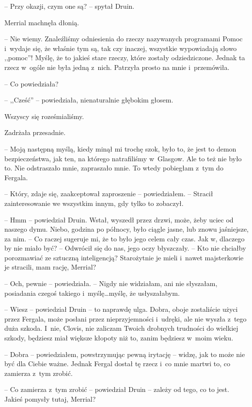 \documentclass[oneside,polish,11pt,sfheadings]{mwbk}
\begin{document}
-- Przy okazji, czym one są? -- spytał Druin.

Merrial machnęła dłonią. 

-- Nie wiemy. Znaleźliśmy odniesienia do rzeczy
nazywanych programami Pomoc i~wydaje się, że właśnie tym są, tak czy
inaczej, wszystkie wypowiadają słowo ,,pomoc''! Myślę, że to jakieś
stare rzeczy, które zostały odziedziczone. Jednak ta rzecz w~ogóle nie
była jedną z~nich. Patrzyła prosto na mnie i~przemówiła.

-- Co powiedziała?

-- ,,Cześć'' -- powiedziała, nienaturalnie głębokim głosem.

Wszyscy się roześmialiśmy.

Zadrżała przesadnie. 

-- Moją następną myślą, kiedy minął mi trochę szok,
było to, że jest to demon bezpieczeństwa, jak ten, na którego
natrafiliśmy w~Glasgow. Ale to też nie było to. Nie odstraszało mnie,
zapraszało mnie. To wtedy pobiegłam z~tym do Fergala.

-- Który, zdaje się, zaakceptował zaproszenie -- powiedziałem. -- Stracił
zainteresowanie we wszystkim innym, gdy tylko to zobaczył.

-- Hmm -- powiedział Druin. Wstał, wyszedł przez drzwi, może, żeby uciec
od naszego dymu. Niebo, godzina po północy, było ciągle jasne, lub znowu
jaśniejsze, za nim. -- Co raczej sugeruje mi, że to było jego celem cały
czas. Jak w, dlaczego by nie miało być? -- Odwrócił się do nas, jego oczy
błyszczały. -- Kto nie chciałby porozmawiać ze sztuczną inteligencją?
Starożytnie je mieli i~nawet majsterkowie je stracili, mam rację,
Merrial?

-- Och, pewnie -- powiedziała. -- Nigdy nie widziałam, ani nie słyszałam,
posiadania czegoś takiego i~myślę\ldots myślę, że usłyszałabym.

-- Wiesz -- powiedział Druin -- to naprawdę ulga. Dobra, oboje zostaliście
użyci przez Fergala, może posłani przez nieprzyjemności i~udręki, ale
nie wyszła z~tego duża szkoda. I~nie, Clovis, nie zaliczam Twoich
drobnych trudności do wielkiej szkody, będziesz miał większe kłopoty niż
to, zanim będziesz w~moim wieku.

-- Dobra -- powiedziałem, powstrzymując pewną irytację -- widzę, jak to
może nie być dla Ciebie ważne. Jednak Fergal dostał tę rzecz i~co mnie
martwi to, co zamierza z~tym zrobić.

-- Co zamierza z~tym zrobić -- powiedział Druin -- zależy od tego, co to
jest. Jakieś pomysły tutaj, Merrial?
\end{document}
